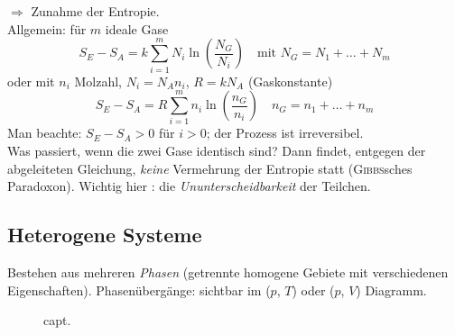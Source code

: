 $\Rightarrow$ Zunahme der Entropie. \\[\baselineskip]
Allgemein: für $m$ ideale Gase
\begin{equation}
    S_E - S_A = k \sum_{i=1}^{m} N_i \ln \left( \frac{N_G}{N_i} \right) \quad \text{mit } N_G = N_1 + \ldots + N_m
\end{equation}
oder mit $n_i$ Molzahl, $N_i = N_A n_i$, $R = k N_A$ (Gaskonstante)
\begin{equation}
    S_E - S_A = R \sum_{i=1}^{m} n_i \ln \left( \frac{n_G}{n_i} \right) \quad n_G = n_1 + \ldots + n_m
\end{equation}
Man beachte: $S_E - S_A > 0$ für $i > 0$; der Prozess ist irreversibel. \\
Was passiert, wenn die zwei Gase identisch sind? Dann findet, entgegen der abgeleiteten Gleichung, \emph{keine} Vermehrung der Entropie statt
(\textsc{Gibbs}sches Paradoxon). Wichtig hier : die \emph{Ununterscheidbarkeit} der Teilchen.

\subsection{Heterogene Systeme}
Bestehen aus mehreren \emph{Phasen} (getrennte homogene Gebiete mit verschiedenen Eigenschaften). Phasenübergänge: sichtbar im ($p$, $T$) oder
($p$, $V$) Diagramm.

\begin{figure}[H]
        \centering
        \def\svgwidth{\textwidth}
        
        \caption{capt.}
        \label{img:pV-pT}
\end{figure}

